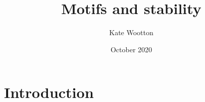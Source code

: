 \documentclass{article}
\title{Motifs and stability}
\author{Kate Wootton}
\date{October 2020}
\begin{document}
\maketitle

\section{Introduction}
\end{document}
